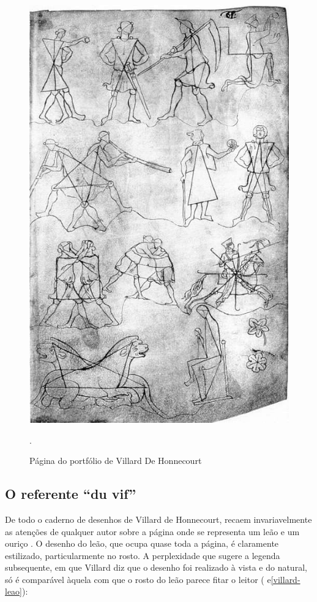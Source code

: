 \documentclass{article}
\begin{document}
\begin{figure}
\centering\includegraphics[height=0.6\textheight,keepaspectratio]
                          {images/villard-figuras-solidas.jpg}
  \caption{Página do portfólio de Villard De Honnecourt}.
  \label{fig:villard-figuras-solidas}
\end{figure}

\subsection{O referente ``du vif''}

De todo o caderno de desenhos de Villard de Honnecourt, recaem
invariavelmente as atenções de qualquer autor sobre a página onde se
representa um leão e um ouriço \cite[p. 20]{villard}. O desenho do
leão, que ocupa quase toda a página, é claramente estilizado,
particularmente no rosto. A perplexidade que sugere a legenda
subsequente, em que Villard diz que o desenho foi realizado à vista e
do natural, só é comparável àquela com que o rosto do leão parece
fitar o leitor (\cite[p. 24, verso]{villard} e\ref{villard-leao}):
\end{document}
